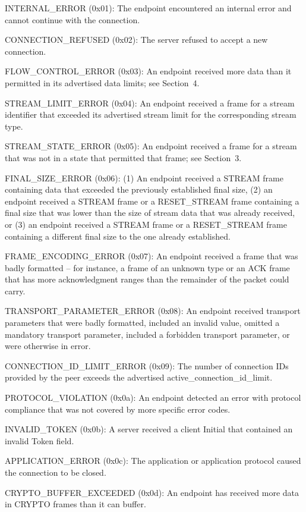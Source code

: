 \documentclass{article}
\begin{document}
INTERNAL\_ERROR (0x01):  The endpoint encountered an internal error and cannot continue with the connection.

CONNECTION\_REFUSED (0x02):  The server refused to accept a new connection.

FLOW\_CONTROL\_ERROR (0x03):  An endpoint received more data than it permitted in its advertised data limits; see Section~4.

STREAM\_LIMIT\_ERROR (0x04):  An endpoint received a frame for a stream identifier that exceeded its advertised stream limit for the corresponding stream type.

STREAM\_STATE\_ERROR (0x05):  An endpoint received a frame for a stream that was not in a state that permitted that frame; see Section~3.

FINAL\_SIZE\_ERROR (0x06):  (1) An endpoint received a STREAM frame containing data that exceeded the previously established final size, (2) an endpoint received a STREAM frame or a RESET\_STREAM frame containing a final size that was lower than the size of stream data that was already received, or (3) an endpoint received a STREAM frame or a RESET\_STREAM frame containing a different final size to the one already established.

FRAME\_ENCODING\_ERROR (0x07):  An endpoint received a frame that was badly formatted -- for instance, a frame of an unknown type or an ACK frame that has more acknowledgment ranges than the remainder of the packet could carry.

TRANSPORT\_PARAMETER\_ERROR (0x08):  An endpoint received transport parameters that were badly formatted, included an invalid value, omitted a mandatory transport parameter, included a forbidden transport parameter, or were otherwise in error.

CONNECTION\_ID\_LIMIT\_ERROR (0x09):  The number of connection IDs provided by the peer exceeds the advertised active\_connection\_id\_limit.

PROTOCOL\_VIOLATION (0x0a):  An endpoint detected an error with protocol compliance that was not covered by more specific error codes.

INVALID\_TOKEN (0x0b):  A server received a client Initial that contained an invalid Token field.

APPLICATION\_ERROR (0x0c):  The application or application protocol caused the connection to be closed.

CRYPTO\_BUFFER\_EXCEEDED (0x0d):  An endpoint has received more data in CRYPTO frames than it can buffer.
\end{document}
